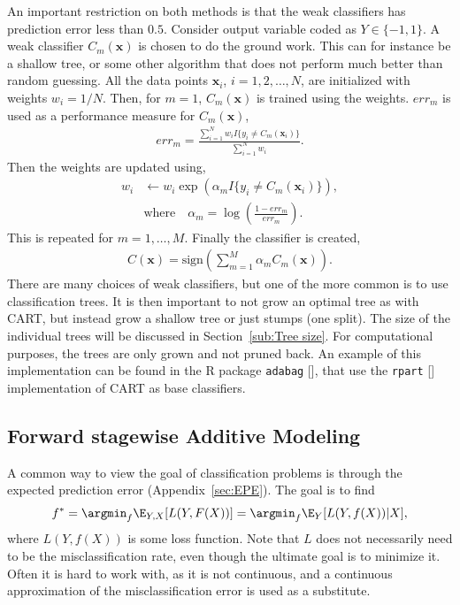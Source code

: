 An important restriction on both methods is that the weak classifiers has prediction error less than $0.5$.
Consider output variable coded as $Y \in \{-1, 1\}$. A weak classifier $C_m(\mathbf{x})$ is chosen to do the ground work. This can for instance be a shallow tree, or some other algorithm that does not perform much better than random guessing. All the data points $\mathbf{x}_i$, $i = 1, 2, \ldots, N$, are initialized with weights $w_i = 1/N$. Then, for $m = 1$, $C_m(\mathbf{x})$ is trained using the weights. $err_m$ is used as a performance measure for $C_m(\mathbf{x})$,
\begin{align}
  err_m =  \frac{\sum^{N}_{i=1} w_i I\{y_i \neq C_m(\mathbf{x}_i)\}}{\sum^{N}_{i=1} w_i}.
\end{align}
Then the weights are updated using, 
\begin{align}
  w_i &\leftarrow w_i \exp\left( \alpha_m I\{y_i \neq C_m(\mathbf{x}_i)\} \right), \\
  &\text{where} \quad \alpha_m = \log\left(  \frac{1-err_m}{err_m} \right).
\end{align}
This is repeated for $m = 1, \ldots, M$. Finally the classifier is created,
\begin{align}
  C( \mathbf{x}) = \text{sign}\left( \sum^{M}_{m=1} \alpha_m C_m(\mathbf{x}) \right).
\end{align}
There are many choices of weak classifiers, but one of the more common is to use classification trees. It is then important to not grow an optimal tree as with CART, but instead grow a shallow tree or just stumps (one split). The size of the individual trees will be discussed in Section~\ref{sub:Tree size}. For computational purposes, the trees are only grown and not pruned back.
An example of this implementation can be found in the R package \verb+adabag+ [\cite{adabag}], that use the \verb+rpart+ [\cite{rpart}] implementation of CART as base classifiers.

\subsection{Forward stagewise Additive Modeling}
\label{sub:Forward stagewise additive modeling}
A common way to view the goal of classification problems is through the expected prediction error (Appendix~\ref{sec:EPE}). The goal is to find
\begin{align}
  \label{eq:fargmin} 
  f^* = \argmin_f \E_{Y, X}[L(Y,F(X))] = \argmin_f \E_Y [L(Y,f(X))|X] ,
\end{align}
where $L(Y, f(X))$ is some loss function. 
Note that $L$ does not necessarily need to be the misclassification rate, even though the ultimate goal is to minimize it.
Often it is hard to work with, as it is not continuous, and a continuous approximation  of the misclassification error is used as a substitute.

